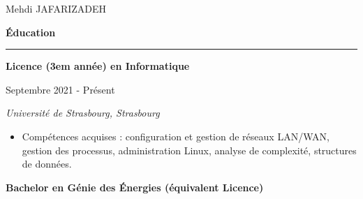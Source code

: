\documentclass[a4paper]{letter}
\newcommand{\divider}{\rule{\linewidth}{0.9pt}}
\begin{document}
\begin{minipage}[t]{0.60\textwidth}





\setlength{\baselineskip}{1.5\baselineskip}
\vspace{0.7cm}

{\huge Mehdi JAFARIZADEH}

\vspace{0.5cm}


{\large \textbf{Éducation}}
\divider


{\textbf{Licence (3em année) en Informatique}}

{\footnotesize Septembre 2021 - Présent}

{\textit{Université de Strasbourg, Strasbourg}}

\vspace{1mm}

\begin{itemize}
    \footnotesize
            
    \item Compétences acquises : configuration et gestion de réseaux LAN/WAN, 
    gestion des processus, administration Linux, analyse de complexité, structures de données.
\end{itemize}

\vspace{3mm}


{\textbf{Bachelor en Génie des Énergies (équivalent Licence)}}


\end{minipage}
\end{document}
